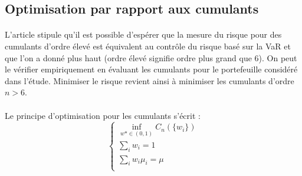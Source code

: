 \documentclass{article}
\begin{document}
      \subsection{Optimisation par rapport aux cumulants}
\paragraph{}      
      L'article stipule qu'il est possible d'espérer que la mesure du risque pour des cumulants d'ordre élevé est équivalent au contrôle du risque basé sur la VaR et que l'on a donné plus haut (ordre élevé signifie ordre plus grand que $6$). On peut le vérifier empiriquement en évaluant les cumulants pour le portefeuille considéré dans l'étude. Minimiser le risque revient ainsi à minimiser les cumulants d'ordre $n>6$.
    \paragraph{}
     Le principe d'optimisation pour les cumulants s'écrit :
       \begin{equation}
  \left\{
      \begin{aligned}
     \inf_{w*\in {(0,1)}}C_{n}(\lbrace w_{i}\rbrace )\\
     \sum _{i} w_{i}=1\\
     \sum _{i} w_{i}\mu_{i}=\mu\\
      \end{aligned}
    \right.
\end{equation} 
    
\end{document}

